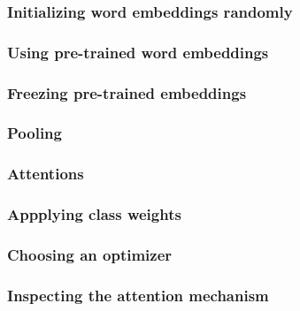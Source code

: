 \subsubsection{Initializing word embeddings randomly}
\label{subsubsec:5_experiments/3_texter/2_static/2_emb_size}


\subsubsection{Using pre-trained word embeddings}
\label{subsubsec:5_experiments/3_texter/2_static/3_pre_trained}


\subsubsection{Freezing pre-trained embeddings}
\label{subsubsec:5_experiments/3_texter/2_static/4_update_vectors}


\subsubsection{Pooling}
\label{subsubsec:5_experiments/3_texter/2_static/5_pooling}


\subsubsection{Attentions}
\label{subsubsec:5_experiments/3_texter/2_static/6_activation}


\subsubsection{Appplying class weights}
\label{subsubsec:5_experiments/3_texter/2_static/7_weight_factor}


\subsubsection{Choosing an optimizer}
\label{subsubsec:5_experiments/3_texter/2_static/8_optimizer}


\subsubsection{Inspecting the attention mechanism}
\label{subsubsec:5_experiments/3_texter/2_static/9_attention}


